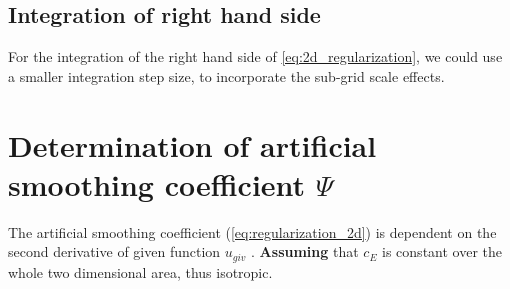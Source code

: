 \subsection{Integration of right hand side}
For the integration of the right hand side of \autoref{eq:2d_regularization}, we could use a smaller integration step size, to incorporate the sub-grid scale effects.

\section{Determination of artificial smoothing coefficient $\Psi$} \label{sec:artificial_viscosity}
The artificial smoothing coefficient (\autoref{eq:regularization_2d}) is dependent on the second derivative of given function $u_{giv}$ \citep[eq.\ 8]{Borsboom1998}.
\textbf{Assuming} that $c_E$ is constant over the whole two dimensional area, thus isotropic.



